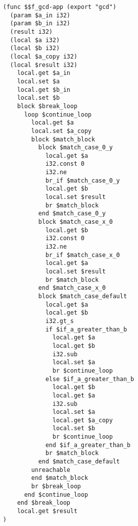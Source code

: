 \begin{verbatim}
(func $$f_gcd-app (export "gcd")
  (param $a_in i32)
  (param $b_in i32)
  (result i32)
  (local $a i32)
  (local $b i32)
  (local $a_copy i32)
  (local $result i32)
    local.get $a_in
    local.set $a
    local.get $b_in
    local.set $b
    block $break_loop
      loop $continue_loop
        local.get $a
        local.set $a_copy
        block $match_block
          block $match_case_0_y
            local.get $a
            i32.const 0
            i32.ne
            br_if $match_case_0_y
            local.get $b
            local.set $result
            br $match_block
          end $match_case_0_y
          block $match_case_x_0
            local.get $b
            i32.const 0
            i32.ne
            br_if $match_case_x_0
            local.get $a
            local.set $result
            br $match_block
          end $match_case_x_0
          block $match_case_default
            local.get $a
            local.get $b
            i32.gt_s
            if $if_a_greater_than_b
              local.get $a
              local.get $b
              i32.sub
              local.set $a
              br $continue_loop
            else $if_a_greater_than_b
              local.get $b
              local.get $a
              i32.sub
              local.set $a
              local.get $a_copy
              local.set $b
              br $continue_loop
            end $if_a_greater_than_b
            br $match_block
          end $match_case_default
        unreachable
        end $match_block
        br $break_loop
      end $continue_loop
    end $break_loop
    local.get $result
)
\end{verbatim}